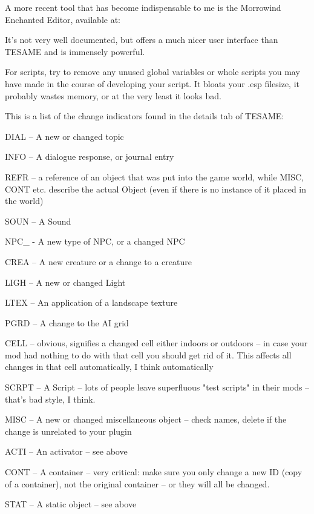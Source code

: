 
A more recent tool that has become indispensable to me is the Morrowind
Enchanted Editor, available at:


It's not very well documented, but offers a much nicer user interface
than TESAME and is immensely powerful.

For scripts, try to remove any unused global variables or whole scripts
you may have made in the course of developing your script. It bloats
your .esp filesize, it probably wastes memory, or at the very least it
looks bad.

This is a list of the change indicators found in the details tab of
TESAME:

DIAL -- A new or changed topic

INFO -- A dialogue response, or journal entry

REFR -- a reference of an object that was put into the game world, while
MISC, CONT etc. describe the actual Object (even if there is no instance
of it placed in the world)

SOUN -- A Sound

NPC\_ - A new type of NPC, or a changed NPC

CREA -- A new creature or a change to a creature

LIGH -- A new or changed Light

LTEX -- An application of a landscape texture

PGRD -- A change to the AI grid

CELL -- obvious, signifies a changed cell either indoors or outdoors --
in case your mod had nothing to do with that cell you should get rid of
it. This affects all changes in that cell automatically, I think
automatically

SCRPT -- A Script -- lots of people leave superfluous "test scripts" in
their mods -- that's bad style, I think.

MISC -- A new or changed miscellaneous object -- check names, delete if
the change is unrelated to your plugin

ACTI -- An activator -- see above

CONT -- A container -- very critical: make sure you only change a new ID
(copy of a container), not the original container -- or they will all be
changed.

STAT -- A static object -- see above

